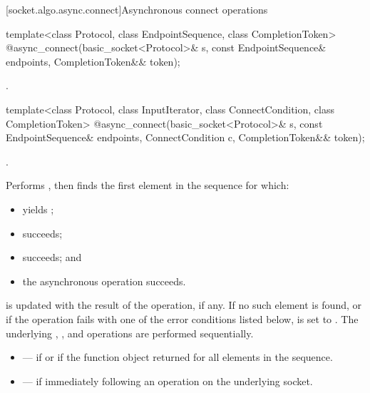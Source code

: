 [socket.algo.async.connect]{Asynchronous connect operations}

\begin{itemdecl}
template<class Protocol, class EndpointSequence, class CompletionToken>
  @\DEDUCED@ async_connect(basic_socket<Protocol>& s,
                        const EndpointSequence& endpoints,
                        CompletionToken&& token);
\end{itemdecl}

\begin{itemdescr}
\pnum
\returns {}.
\end{itemdescr}

\begin{itemdecl}
template<class Protocol, class InputIterator,
  class ConnectCondition, class CompletionToken>
    @\DEDUCED@ async_connect(basic_socket<Protocol>& s,
                          const EndpointSequence& endpoints,
                          ConnectCondition c,
                          CompletionToken&& token);
\end{itemdecl}

\begin{itemdescr}
\pnum
\completionsig {}.

\pnum
\effects Performs , then finds the first element  in the sequence  for which:
\begin{itemize}
\item
{} yields ;
\item
{} succeeds;
\item
{} succeeds; and
\item
 the asynchronous operation  succeeds.
\end{itemize}
\pnum
{} is updated with the result of the  operation, if any. If no such element is found, or if the operation fails with one of the error conditions listed below,  is set to . \enternote The underlying , , and  operations are performed sequentially. \exitnote

\pnum
\errors
\begin{itemize}
\item
{} --- if  or if the function object  returned  for all elements in the sequence.
\item
{} --- if  immediately following an  operation on the underlying socket.
\end{itemize}
\end{itemdescr}

